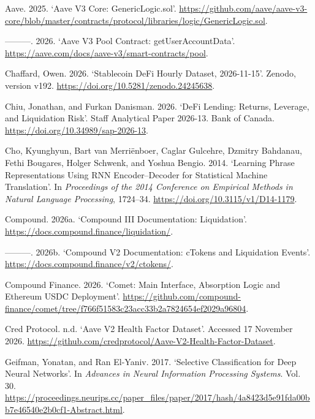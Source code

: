 \documentclass[
  10pt,
  a4paper,
]{article}
\newlength{\cslhangindent}
\newenvironment{CSLReferences}[2] %
 {\begin{list}{}{%
  \setlength{\itemindent}{0pt}
  \setlength{\leftmargin}{0pt}
  \setlength{\parsep}{0pt}
  \ifodd #1
   \setlength{\leftmargin}{\cslhangindent}
   \setlength{\itemindent}{-1\cslhangindent}
  \fi
  \setlength{\itemsep}{#2\baselineskip}}}
 {\end{list}}
\begin{document}
\label{refs}
\begin{CSLReferences}{1}{0}
Aave. 2025. {`Aave V3 Core: GenericLogic.sol'}.
\url{https://github.com/aave/aave-v3-core/blob/master/contracts/protocol/libraries/logic/GenericLogic.sol}.

---------. 2026. {`Aave V3 Pool Contract: getUserAccountData'}.
\url{https://aave.com/docs/aave-v3/smart-contracts/pool}.

Chaffard, Owen. 2026. {`Stablecoin {DeFi} Hourly Dataset, 2026-11-15'}.
Zenodo, version v192. \url{https://doi.org/10.5281/zenodo.24245638}.

Chiu, Jonathan, and Furkan Danisman. 2026. {`{DeFi} Lending: Returns,
Leverage, and Liquidation Risk'}. Staff Analytical Paper 2026-13. Bank
of Canada. \url{https://doi.org/10.34989/sap-2026-13}.

Cho, Kyunghyun, Bart van Merriënboer, Caglar Gulcehre, Dzmitry Bahdanau,
Fethi Bougares, Holger Schwenk, and Yoshua Bengio. 2014. {`Learning
Phrase Representations Using {RNN} Encoder--Decoder for Statistical
Machine Translation'}. In \emph{Proceedings of the 2014 Conference on
Empirical Methods in Natural Language Processing}, 1724--34.
\url{https://doi.org/10.3115/v1/D14-1179}.

Compound. 2026a. {`Compound III Documentation: Liquidation'}.
\url{https://docs.compound.finance/liquidation/}.

---------. 2026b. {`Compound V2 Documentation: cTokens and Liquidation
Events'}. \url{https://docs.compound.finance/v2/ctokens/}.

Compound Finance. 2026. {`Comet: Main Interface, Absorption Logic and
Ethereum USDC Deployment'}.
\url{https://github.com/compound-finance/comet/tree/f766f51583c23acc33b2a7824654ef2029a96804}.

Cred Protocol. n.d. {`Aave V2 Health Factor Dataset'}. Accessed 17
November 2026.
\url{https://github.com/credprotocol/Aave-V2-Health-Factor-Dataset}.

Geifman, Yonatan, and Ran El-Yaniv. 2017. {`Selective Classification for
Deep Neural Networks'}. In \emph{Advances in Neural Information
Processing Systems}. Vol. 30.
\url{https://proceedings.neurips.cc/paper_files/paper/2017/hash/4a8423d5e91fda00bb7e46540e2b0cf1-Abstract.html}.


\end{CSLReferences}
\end{document}
